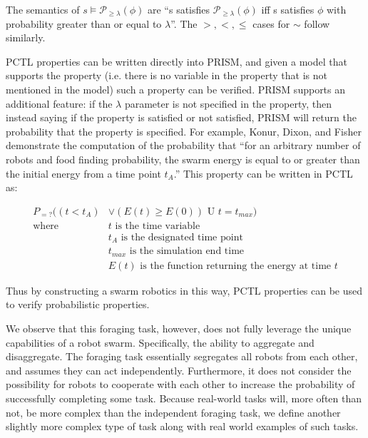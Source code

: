 \documentclass[11pt]{article}
\theoremstyle{definition}
\begin{document}
The semantics of $ s \vDash \mathcal{P}_{\geq\lambda} ( \phi ) $ are
``s satisfies $ \mathcal{P}_{\geq\lambda} ( \phi ) $ iff s
satisfies $ \phi $ with probability greater than or equal
to $ \lambda $''.
The $ >, <, \leq $ cases for $ \sim $ follow similarly.

PCTL properties can be written directly into PRISM, and
given a model that supports the property (i.e. there is
no variable in the property that is not mentioned
in the model) such a property can be verified.
PRISM supports an additional feature: if the $ \lambda $
parameter is not specified in the property, then
instead saying if the property is satisfied or not
satisfied, PRISM will return the probability that
the property is specified. For example, Konur,
Dixon, and Fisher demonstrate the computation of
the probability that ``for an arbitrary number of robots
and food finding probability, the swarm energy is
equal to or greater than the initial energy from
a time point $ t_A $.'' This property can be written
in PCTL as:

\begin{align*}
    P_{=?}((t < t_A) & \vee (E(t) \geq E(0)) \text{ U } t = t_{max} ) \\
    \text{where } & t \text{ is the time variable} \\
                  & t_A \text{ is the designated time point} \\
                  & t_{max} \text{ is the simulation end time} \\
                  & E(t) \text{ is the function returning the energy at time } t
\end{align*}

Thus by constructing a swarm robotics in this way,
PCTL properties can be used to verify probabilistic
properties.

We observe that this foraging task, however, does
not fully leverage the unique capabilities of
a robot swarm. Specifically, the ability
to aggregate and disaggregate. The foraging
task essentially segregates all robots from
each other, and assumes they can act
independently. Furthermore, it does not
consider the possibility for robots to
cooperate with each other to increase
the probability of successfully completing
some task. Because real-world tasks will,
more often than not, be more complex than
the independent foraging task, we define
another slightly more complex type of task
along with real world examples of such tasks.
\end{document}
